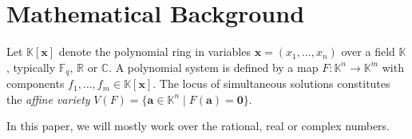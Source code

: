\section*{Mathematical Background}
Let $\mathbb{K}[\mathbf{x}]$ denote the polynomial ring in variables $\mathbf{x} = (x_1, \ldots, x_n)$ over a field $\mathbb{K}$, typically $\mathbb{F}_q$, $\mathbb{R}$ or $\mathbb{C}$. A polynomial system is defined by a map $F: \mathbb{K}^n \to \mathbb{K}^m$ with components $f_1, \ldots, f_m \in \mathbb{K}[\mathbf{x}]$. The locus of simultaneous solutions constitutes the \textit{affine variety} $V(F) = \{ \mathbf{a} \in \mathbb{K}^n \mid F(\mathbf{a}) = \mathbf{0} \}$.

In this paper, we will mostly work over the rational, real or complex numbers.
